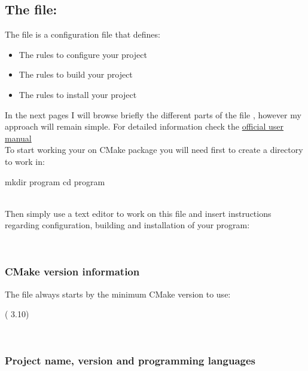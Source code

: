 \subsection{The file: } 

The file  is a configuration file that defines:  
\begin{itemize}
\item The rules to configure your project
\item The rules to build your project
\item The rules to install your project
\end{itemize}
In the next pages I will browse briefly the different parts of the file , however my approach will remain simple. 
For detailed information check the \href{https://cmake.org/cmake/help/latest/index.html}{official user manual} \\[0.25cm]
To start working your on CMake package you will need first to create a directory to work in:
\begin{script}
\fprompt{~} mkdir program
\fprompt{~} cd program
\end{script}
\\[-0.25cm]
\noindent Then simply use a text editor to work on this file and insert instructions regarding configuration, building and installation of your program:
\begin{script}
  
\end{script}
\\[-1.5cm]

\subsubsection*{CMake version information}

The file  always starts by the minimum CMake version to use: 
\begin{script}
 ( 3.10)
\end{script}
\\[-1.5cm]

\subsubsection*{Project name, version and programming languages}
\label{cmake_pname}


